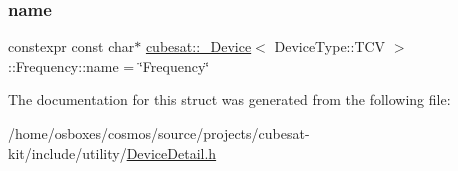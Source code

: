 \subsubsection{\texorpdfstring{name}{name}}
{\footnotesize\ttfamily constexpr const char$\ast$ \hyperlink{structcubesat_1_1__Device}{cubesat\+::\+\_\+\+Device}$<$ Device\+Type\+::\+T\+CV $>$\+::Frequency\+::name = \char`\"{}Frequency\char`\"{}\hspace{0.3cm}{\ttfamily [static]}}



The documentation for this struct was generated from the following file\+:\begin{DoxyCompactItemize}
\item 
/home/osboxes/cosmos/source/projects/cubesat-\/kit/include/utility/\hyperlink{DeviceDetail_8h}{Device\+Detail.\+h}\end{DoxyCompactItemize}
